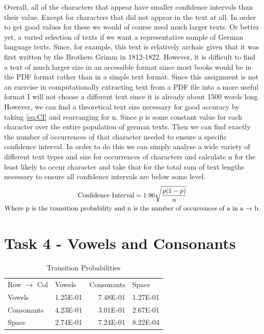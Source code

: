 \documentclass[11pt,a4paper]{CLabBookTemplate} %
\begin{document}
Overall, all of the characters that appear have smaller confidence intervals than their value. Except for characters that did not appear in the text at all. In order to get good values for these we would of course need much larger texts. Or better yet, a varied selection of texts if we want a representative sample of German language texts. Since, for example, this text is relatively archaic given that it was first written by the Brothers Grimm in 1812-1822. However, it is difficult to find a text of much larger size in an accessible format since most books would be in the PDF format rather than in a simple text format. Since this assignment is not an exercise in computationally extracting text from a PDF file into a more useful format I will not choose a different text since it is already about 1500 words long. However, we can find a theoretical text size necessary for good accuracy by taking \eqref{eq:CI} and rearranging for n. Since p is some constant value for each character over the entire population of german texts. Then we can find exactly the number of occurrences of that character needed to ensure a specific confidence interval. In order to do this we can simply analyse a wide variety of different text types and size for occurrences of characters and calculate n for the least likely to occur character and take that for the total sum of text lengths necessary to ensure all confidence intervals are below some level. \\


\begin{gather}
\label{eq:CI}
	\textrm{Confidence Interval} = 1.96\sqrt{\frac{p(1-p)}{n}} \\
	\textrm{Where p is the transition probability and n is the number of occurrences of a in a $\rightarrow$ b.} \notag
\end{gather}

\newpage
\section{Task 4 - Vowels and Consonants}

\begin{table}[htbp]
	\centering
	\caption{Transition Probabilities}
	\begin{tabular}{lrrr}
		Row $\rightarrow$ Col & \multicolumn{1}{l}{Vowels} & \multicolumn{1}{l}{Consonants} & \multicolumn{1}{l}{Space} \\
		Vowels     & 1.25E-01 & 7.48E-01 & 1.27E-01 \\
		Consonants     & 4.23E-01 & 3.01E-01 & 2.67E-01 \\
		Space & 2.74E-01 & 7.24E-01 & 8.22E-04 \\
	\end{tabular}%
	\label{tab:Task4_Transition}%
\end{table}%
\end{document}
